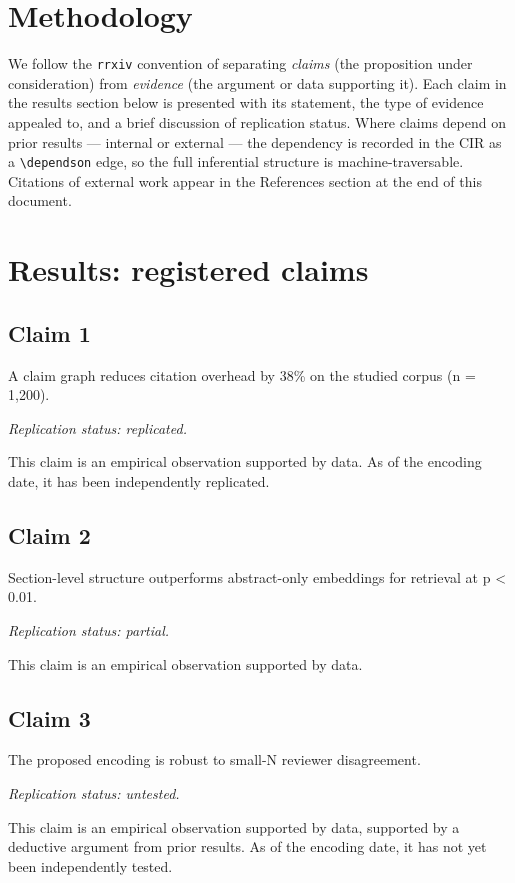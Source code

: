 \documentclass{rrxiv}
\begin{document}
\section{Methodology}
We follow the \texttt{rrxiv} convention of separating \emph{claims} (the proposition under consideration) from \emph{evidence} (the argument or data supporting it). Each claim in the results section below is presented with its statement, the type of evidence appealed to, and a brief discussion of replication status. Where claims depend on prior results --- internal or external --- the dependency is recorded in the CIR as a \texttt{\textbackslash dependson} edge, so the full inferential structure is machine-traversable. Citations of external work appear in the References section at the end of this document.

\section{Results: registered claims}
\subsection*{Claim 1}
\begin{claim}[Claim 1]
\label{claim:c1}
A claim graph reduces citation overhead by 38\% on the studied corpus (n = 1,200).

\emph{Replication status: replicated.}
\end{claim}
This claim is an empirical observation supported by data. As of the encoding date, it has been independently replicated.

\subsection*{Claim 2}
\begin{claim}[Claim 2]
\label{claim:c2}
Section-level structure outperforms abstract-only embeddings for retrieval at p \textless{} 0.01.

\emph{Replication status: partial.}
\end{claim}
This claim is an empirical observation supported by data.

\subsection*{Claim 3}
\begin{claim}[Claim 3]
\label{claim:c3}
The proposed encoding is robust to small-N reviewer disagreement.

\emph{Replication status: untested.}
\end{claim}
This claim is an empirical observation supported by data, supported by a deductive argument from prior results. As of the encoding date, it has not yet been independently tested.
\end{document}
